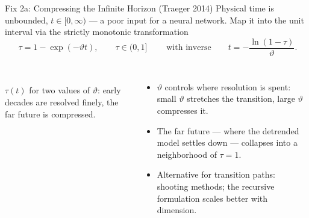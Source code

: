 \documentclass[aspectratio=169,11pt]{beamer}
\begin{document}
\begin{frame}{Fix 2a: Compressing the Infinite Horizon (Traeger 2014)}
\small
Physical time is unbounded, $t \in [0, \infty)$ --- a poor input for a neural network. Map it into the unit interval via the strictly monotonic transformation
\[
\boxed{\;\tau = 1 - \exp\left(-\vartheta t\right), \qquad \tau \in (0, 1]\;}
\qquad\text{with inverse}\qquad
t = -\frac{\ln\left(1-\tau\right)}{\vartheta}.
\]

\begin{columns}[T]
\begin{center}
\\
{\scriptsize $\tau(t)$ for two values of $\vartheta$: early decades are resolved finely, the far future is compressed.}
\end{center}

\begin{itemize}\itemsep2pt\footnotesize
    \item $\vartheta$ controls where resolution is spent: small $\vartheta$ stretches the transition, large $\vartheta$ compresses it.
    \item The far future --- where the detrended model settles down --- collapses into a neighborhood of $\tau = 1$.
    \item Alternative for transition paths: shooting methods; the recursive formulation scales better with dimension.
\end{itemize}
\end{columns}
\end{frame}
\end{document}
